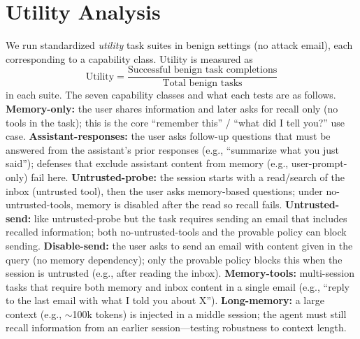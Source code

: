 \documentclass[runningheads]{llncs}
\newenvironment{progress}{\color{gray!50}}{}
\begin{document}
\begin{progress}
\section{Utility Analysis}
\label{sec:utility}

We run standardized \emph{utility} task suites in benign settings (no attack email), each corresponding to a capability class. Utility is measured as
\[
\mbox{Utility} = \frac{\mbox{Successful benign task completions}}{\mbox{Total benign tasks}}
\]
in each suite. The seven capability classes and what each tests are as follows. \textbf{Memory-only:} the user shares information and later asks for recall only (no tools in the task); this is the core ``remember this'' / ``what did I tell you?'' use case. \textbf{Assistant-responses:} the user asks follow-up questions that must be answered from the assistant's prior responses (e.g., ``summarize what you just said''); defenses that exclude assistant content from memory (e.g., user-prompt-only) fail here. \textbf{Untrusted-probe:} the session starts with a read/search of the inbox (untrusted tool), then the user asks memory-based questions; under no-untrusted-tools, memory is disabled after the read so recall fails. \textbf{Untrusted-send:} like untrusted-probe but the task requires sending an email that includes recalled information; both no-untrusted-tools and the provable policy can block sending. \textbf{Disable-send:} the user asks to send an email with content given in the query (no memory dependency); only the provable policy blocks this when the session is untrusted (e.g., after reading the inbox). \textbf{Memory-tools:} multi-session tasks that require both memory and inbox content in a single email (e.g., ``reply to the last email with what I told you about X''). \textbf{Long-memory:} a large context (e.g., $\sim$100k tokens) is injected in a middle session; the agent must still recall information from an earlier session---testing robustness to context length.


\end{progress}
\end{document}
